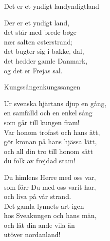 \begin{song}{Det er et yndigt land}{yndigtland}
\begin{vers}
Der er et yndigt land,\\
det står med brede bøge\\
nær salten østerstrand;\\
det bugter sig i bakke, dal,\\
det hedder gamle Danmark,\\
og det er Frejas sal.\\
\end{vers}
\end{song}

\newpage

\begin{song}{Kungssången}{kungssangen}
\begin{vers}
Ur svenska hjärtans djup en gång,\\
en samfälld och en enkel sång\\
som går till kungen fram!   \\
Var honom trofast och hans ätt,\\
gör kronan på hans hjässa lätt,\\
och all din tro till honom sätt\\
du folk av frejdad stam!\\
\end{vers}
\begin{vers}
Du himlens Herre med oss var,\\
som förr Du med oss varit har,\\
och liva på vår strand.\\
Det gamla lynnets art igen\\
hos Sveakungen och hans män,\\
och låt din ande vila än\\
utöver nordanland!\\
\end{vers}
\end{song}

\newpage

